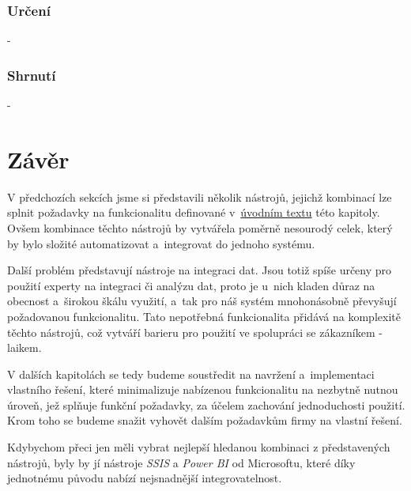 \subsubsection{Určení} 
- 

\subsubsection{Shrnutí}
- 


\section{Závěr}\label{sec:AnalysEnd}

V předchozích sekcích jsme si představili několik nástrojů, jejichž kombinací lze splnit požadavky na funkcionalitu definované v~\hyperref[chap:analysis]{úvodním textu} této kapitoly. 
Ovšem kombinace těchto nástrojů by vytvářela poměrně nesourodý celek, který by bylo složité automatizovat a~integrovat do jednoho systému. 

Další problém představují nástroje na integraci dat.
Jsou totiž spíše určeny pro použití experty na integraci či analýzu dat, proto je u~nich kladen důraz na obecnost a~širokou škálu využití, a~tak pro náš systém mnohonásobně převyšují požadovanou funkcionalitu.
Tato nepotřebná funkcionalita přidává na komplexitě těchto nástrojů, což vytváří barieru pro použití ve spolupráci se zákazníkem - laikem.

V dalších kapitolách se tedy budeme soustředit na navržení a~implementaci vlastního řešení, které minimalizuje nabízenou funkcionalitu na nezbytně nutnou úroveň, jež splňuje funkční požadavky, za účelem zachování jednoduchosti použití.
Krom toho se budeme snažit vyhovět dalším požadavkům firmy na vlastní řešení.

Kdybychom přeci jen měli vybrat nejlepší hledanou kombinaci z představených nástrojů, byly by jí nástroje \textit{SSIS} a \textit{Power BI} od Microsoftu, které díky jednotnému původu nabízí nejsnadnější integrovatelnost.
